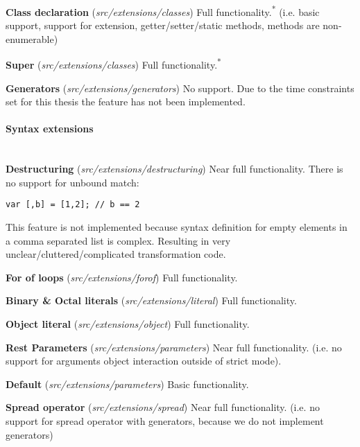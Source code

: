 \textbf{Class declaration} (\textit{src/extensions/classes}) \newline
Full functionality.\textsuperscript{*} (i.e. basic support, support for extension, getter/setter/static methods, methods are non-enumerable)

\textbf{Super} (\textit{src/extensions/classes}) \newline
Full functionality.\textsuperscript{*}

\textbf{Generators} (\textit{src/extensions/generators}) \newline
No support. Due to the time constraints set for this thesis the feature has not been implemented. 

\paragraph{Syntax extensions}\mbox{}\\
\textbf{Destructuring} (\textit{src/extensions/destructuring}) \newline
Near full functionality. There is no support for unbound match:
\begin{lstlisting}
var [,b] = [1,2]; // b == 2
\end{lstlisting}
This feature is not implemented because syntax definition for empty elements in a comma separated list is complex. Resulting in very unclear/cluttered/complicated transformation code.

\textbf{For of loops} (\textit{src/extensions/forof}) \newline
Full functionality.

\textbf{Binary \& Octal literals} (\textit{src/extensions/literal}) \newline
Full functionality.

\textbf{Object literal} (\textit{src/extensions/object}) \newline
Full functionality.

\textbf{Rest Parameters} (\textit{src/extensions/parameters}) \newline
Near full functionality. (i.e. no support for arguments object interaction outside of strict mode).

\textbf{Default} (\textit{src/extensions/parameters}) \newline
Basic functionality.

\textbf{Spread operator} (\textit{src/extensions/spread}) \newline
Near full functionality. (i.e. no support for spread operator with generators, because we do not implement generators)

